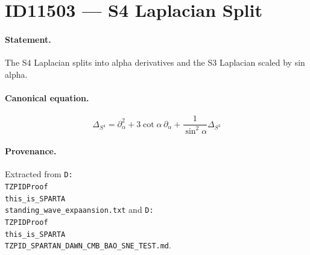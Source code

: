 \section*{ID11503 --- S4 Laplacian Split}

\paragraph{Statement.}
The S4 Laplacian splits into alpha derivatives and the S3 Laplacian scaled by sin alpha.

\paragraph{Canonical equation.}
\[
\Delta_{S^4}=\partial_\alpha^2+3\cot\alpha\,\partial_\alpha+\frac{1}{\sin^2\alpha}\Delta_{S^3}
\]

\paragraph{Provenance.}
Extracted from \texttt{D:\\TZPIDProof\\this\_is\_SPARTA\\standing\_wave\_expaansion.txt} and \texttt{D:\\TZPIDProof\\this\_is\_SPARTA\\TZPID\_SPARTAN\_DAWN\_CMB\_BAO\_SNE\_TEST.md}.
